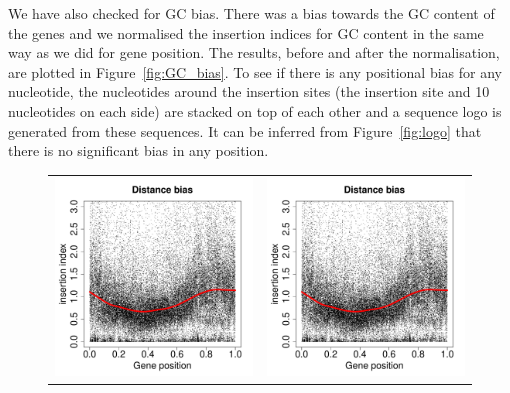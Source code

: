 \documentclass[a4paper,10pt, twocolumn]{article}
\begin{document}
We have also checked for GC bias. There was a bias towards the GC content of the genes and we normalised the insertion indices for GC content in the same way as we did for gene position. The results, before and after the normalisation, are plotted in Figure~\ref{fig:GC_bias}. To see if there is any positional bias for any nucleotide, the nucleotides around the insertion sites (the insertion site and 10 nucleotides on each side) are stacked on top of each other and a sequence logo is generated from these sequences. It can be inferred from Figure~\ref{fig:logo} that there is no significant bias in any position. 

\begin{figure}
\centering
\begin{tabular}{c c}
\includegraphics[scale=0.35, page=26]{biases.pdf} &
\includegraphics[scale=0.35, page=27]{biases.pdf}

\end{tabular}
\end{figure}
\end{document}
